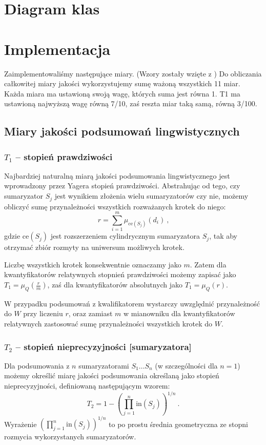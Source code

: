 \documentclass{classrep}
\begin{document}
\section{Diagram klas}

\section{Implementacja}
Zaimplementowaliśmy następujące miary. (Wzory zostały wzięte z \cite{adam})
Do obliczania całkowitej miary jakości wykorzystujemy sumę ważoną wszystkich 11 miar. Każda miara ma ustawioną swoją wagę, których suma jest równa 1. T1 ma ustawioną najwyższą wagę równą 7/10, zaś reszta miar taką samą, równą 3/100.

\subsection{Miary jakości podsumowań lingwistycznych}

\subsubsection{\(T_1\) -- stopień prawdziwości}

Najbardziej naturalną miarą jakości podsumowania lingwistycznego
jest wprowadzony przez Yagera stopień prawdziwości.
Abstrahując od tego, czy sumaryzator \(S_j\) jest wynikiem
złożenia wielu sumaryzatorów czy nie, możemy obliczyć
sumę przynależności wszystkich rozważanych krotek do niego:
\[r = \sum_{i=1}^{m} \mu_{\mathrm{ce}(S_j)}(d_i) ~\mbox{,}\]
gdzie \(\mathrm{ce}(S_j)\) jest rozszerzeniem cylindrycznym
sumaryzatora \(S_j\), tak aby otrzymać zbiór rozmyty na uniwersum
możliwych krotek.

Liczbę wszystkich krotek konsekwentnie oznaczamy jako \(m\).
Zatem dla kwantyfikatorów relatywnych stopnień
prawdziwości możemy zapisać jako \(T_1 = \mu_Q(\frac{r}{m})\),
zaś dla kwantyfikatorów absolutnych jako \(T_1 = \mu_Q(r)\).

W przypadku podsumowań z kwalifikatorem wystarczy uwzględnić
przynależność do \(W\) przy liczeniu \(r\), oraz zamiast \(m\)
w mianowniku dla kwantyfikatorów relatywnych zastosować
sumę przynależności wszystkich krotek do \(W\).

\subsubsection{\(T_2\) -- stopień nieprecyzyjności [sumaryzatora]}
Dla podsumowania z \(n\) sumaryzatorami \(S_1 \ldots S_n\)
(w szczególności dla \(n=1\)) możemy określić miarę
jakości podsumowania określaną jako stopień nieprecyzyjności,
definiowaną następującym wzorem:
\[T_2 = 1 - \left(\prod_{j=1}^{n} \mathrm{in}(S_j)\right)^{1/n} ~\mbox{.}\]
Wyrażenie \(\left(\prod_{j=1}^{n} \mathrm{in}(S_j)\right)^{1/n}\) to po prostu
średnia geometryczna ze stopni rozmycia wykorzystanych sumaryzatorów.
\end{document}
